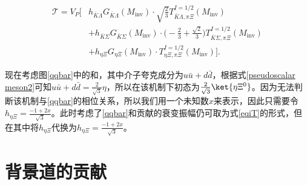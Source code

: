 \begin{equation}
	\label{eqiT}
\begin{split}
	\mathcal{T}=V_{P}\Bigg[&h_{\bar{K}\Lambda}G_{\bar{K}\Lambda}(M_{\text{inv}})\cdot\sqrt{\frac{2}{3}}T_{\bar{K}\Lambda,\pi\Xi}^{I=1/2}(M_{\text{inv}})\\[1ex]
			       &+h_{\bar{K}\Sigma}G_{\bar{K}\Sigma}(M_{\text{inv}})\cdot\Big(-\frac{2}{3}+\frac{\sqrt{2}}{3}\Big)T_{\bar{K}\Sigma,\pi\Xi}^{I=1/2}(M_{\text{inv}})\\[1ex]
			       &+h_{\eta\Xi}G_{\eta\Xi}(M_{\text{inv}})\cdot T_{\eta\Xi,\pi\Xi}^{I=1/2}(M_{\text{inv}})\Bigg].
\end{split}
\end{equation}\par
现在考虑图\ref{qqbar}中的和，其中介子夸克成分为$u\bar{u}+d\bar{d}$，根据式\eqref{pseudoscalar meson2}可知$u\bar{u}+d\bar{d}=\frac{2}{\sqrt{3}}\eta$，所以在该机制下初态为$\frac{2}{\sqrt{3}}\ket{\eta\Xi^{0}}$。因为无法判断该机制与\ref{qqbar}的相位关系，所以我们用一个未知数$x$来表示，因此只需要令$h_{\eta\Xi}=\frac{-1+2x}{\sqrt{3}}$。此时考虑了\ref{qqbar}和贡献的衰变振幅仍可取为式\eqref{eqiT}的形式，但在其中将$h_{\eta\Xi}$代换为$h_{\eta\Xi}=\frac{-1+2x}{\sqrt{3}}$。\par
\newpage
\section{背景道的贡献}
\label{sec34}
